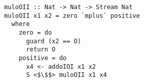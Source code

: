 \begin{figure}[!t]
  \centering
  \begin{minipage}{\columnwidth}
    \begin{lstlisting}[frame=tb]
muloOII :: Nat -> Nat -> Stream Nat
muloOII x1 x2 = zero `mplus` positive
  where
    zero = do
      guard (x2 == O)
      return O
    positive = do
      x4 <- addoIOI x1 x2
      S <$\$$> muloOII x1 x4
    \end{lstlisting}
  \end{minipage}
\end{figure}